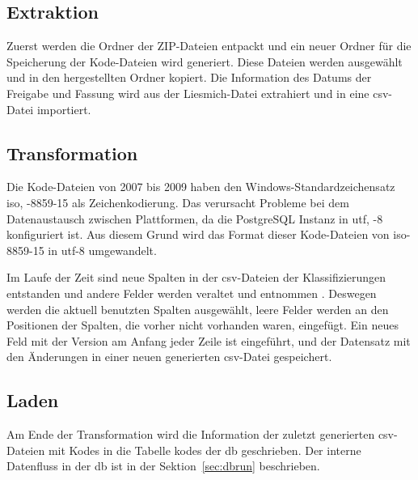 \subsection{Extraktion} \label{subsec:extraction}

Zuerst werden die Ordner der ZIP-Dateien entpackt und ein neuer Ordner für die Speicherung der Kode-Dateien wird generiert. Diese Dateien werden ausgewählt und in den hergestellten Ordner kopiert. Die Information des Datums der Freigabe und Fassung wird aus der Liesmich-Datei extrahiert und in eine \ac{csv}-Datei importiert.

\subsection{Transformation} \label{subsec:transf}

Die Kode-Dateien von 2007 bis 2009 haben den Windows-Standardzeichensatz \acl{iso}, -8859-15 als Zeichenkodierung. Das verursacht Probleme bei dem Datenaustausch zwischen Plattformen, da die PostgreSQL Instanz in \acl{utf}, -8 konfiguriert ist. Aus diesem Grund wird das Format dieser Kode-Dateien von \ac{iso}-8859-15 in \ac{utf}-8 umgewandelt.

Im Laufe der Zeit sind neue Spalten in der \ac{csv}-Dateien der Klassifizierungen entstanden und andere Felder werden veraltet und entnommen \cite{readme13, readme17}. Deswegen werden die aktuell benutzten Spalten ausgewählt, leere Felder werden an den Positionen der Spalten, die vorher nicht vorhanden waren, eingefügt. Ein neues Feld mit der Version am Anfang jeder Zeile ist eingeführt, und der Datensatz mit den Änderungen in einer neuen generierten \ac{csv}-Datei gespeichert.

\subsection{Laden} \label{subsec:load}

Am Ende der Transformation wird die Information der zuletzt generierten \ac{csv}-Dateien mit Kodes in die Tabelle \glqq\textsf{kodes}\grqq{} der \ac{db} geschrieben. Der interne Datenfluss in der \ac{db} ist in der Sektion~\ref{sec:dbrun} beschrieben.